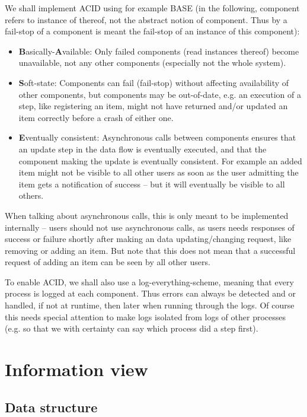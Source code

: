 \documentclass[a4paper,11pt]{report}
\begin{document}
We shall implement ACID using for example BASE (in the following, component refers to instance of thereof, not the abstract notion of component. Thus by a fail-stop of a component is meant the fail-stop of an instance of this component):
\begin{itemize}
    \item \textbf{B}asically-\textbf{A}vailable: Only failed components (read instances thereof) become unavailable, not any other components (especially not the whole system).
    \item \textbf{S}oft-state: Components can fail (fail-stop) without affecting availability of other components, but components may be out-of-date, e.g. an execution of a step, like registering an item, might not have returned and/or updated an item correctly before a crash of either one.
    \item \textbf{E}ventually consistent: Asynchronous calls between components ensures that an update step in the data flow is eventually executed, and that the component making the update is eventually consistent. For example an added item might not be visible to all other users as soon as the user admitting the item gets a notification of success -- but it will eventually be visible to all others.
\end{itemize}
When talking about asynchronous calls, this is only meant to be implemented internally -- users should not use asynchronous calls, as users needs responses of success or failure shortly after making an data updating/changing request, like removing or adding an item. But note that this does not mean that a successful request of adding an item can be seen by all other users.

To enable ACID, we shall also use a log-everything-scheme, meaning that every process is logged at each component. Thus errors can always be detected and or handled, if not at runtime, then later when running through the logs. Of course this needs special attention to make logs isolated from logs of other processes (e.g. so that we with certainty can say which process did a step first).


\section{Information view}
\label{cha:information-view}


\subsection{Data structure}
\label{sec:data-structure}
\end{document}
